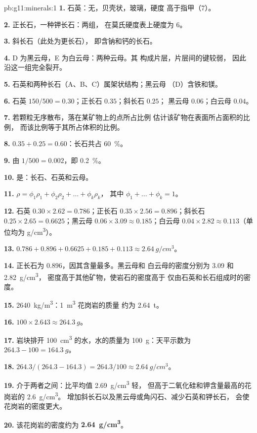 \begin{solution}{pb:g11:minerals:1}
\textbf{1.} 石英：无，贝壳状，玻璃，硬度
高于指甲（7）。

\textbf{2.} 正长石，一种钾长石：两组，
在莫氏硬度表上硬度为 6。

\textbf{3.} 斜长石（此处为更长石），
即含钠和钙的长石。

\textbf{4.} D 为黑云母，E 为白云母：两种云母。其
构成片层，片层间的键较弱，
因此沿这一组完全裂开。

\textbf{5.} 石英和两种长石（A、B、C）属架状结构；黑云母
（D）含铁和镁。

\textbf{6.} 石英 $150/500 = 0.30$；正长石 $0.35$；斜长石 $0.25$；
黑云母 $0.06$；白云母 $0.04$。

\textbf{7.} 若颗粒无序散布，落在某矿物上的点所占比例
估计该矿物在表面所占面积的比例，
而该比例等于其所占体积的比例。

\textbf{8.} $0.35 + 0.25 = 0.60$：长石共占 \qty{60}{\percent}。

\textbf{9.} 由 $1/500 = 0.002$，即 \qty{0.2}{\percent}。

\textbf{10.} 是：长石、石英和云母。

\textbf{11.} $\rho = \phi_1 \rho_1 + \phi_2 \rho_2 + \dots + \phi_k \rho_k$，
其中 $\phi_1 + \dots + \phi_k = 1$。

\textbf{12.} 石英 $0.30 \times 2.62 = 0.786$；正长石 $0.35 \times 2.56 =
0.896$；斜长石 $0.25 \times 2.65 = 0.6625$；黑云母 $0.06 \times 3.09
\approx 0.185$；白云母 $0.04 \times 2.82 \approx 0.113$（单位均为
\unit{g/cm^3}）。

\textbf{13.} $0.786 + 0.896 + 0.6625 + 0.185 + 0.113 \approx
\qty{2.64}{g/cm^3}$。

\textbf{14.} 正长石为 $0.896$，因其含量最多。黑云母和
白云母的密度分别为 \qty{3.09}{} 和 \qty{2.82}{g/cm^3}，
密度高于其他矿物，使岩石的密度高于
仅由石英和长石组成时的密度。

\textbf{15.} \qty{2640}{kg/m^3}：\qty{1}{m^3} 花岗岩的质量
约为 \qty{2.64}{t}。

\textbf{16.} $100 \times 2.643 \approx \qty{264.3}{g}$。

\textbf{17.} 岩块排开 \qty{100}{cm^3} 的水，水的质量为
\qty{100}{g}：天平示数为 $264.3 - 100 = \qty{164.3}{g}$。

\textbf{18.} $264.3/(264.3 - 164.3) = 264.3/100 \approx \qty{2.64}{g/cm^3}$。

\textbf{19.} 介于两者之间：比平均值 \qty{2.69}{g/cm^3} 轻，
但高于二氧化硅和钾含量最高的花岗岩的 \qty{2.6}{g/cm^3}。
增加斜长石以及黑云母或角闪石、减少石英和钾长石，
会使花岗岩的密度更大。

\textbf{20.} 该花岗岩的密度约为
\textbf{\qty{2.64}{g/cm^3}}。
\end{solution}
